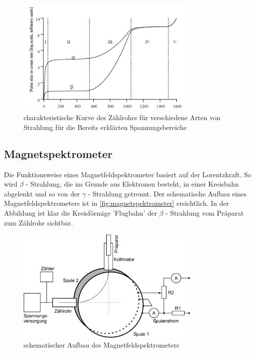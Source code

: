 \documentclass[12pt,english,ngerman]{scrartcl}
\begin{document}
\begin{figure}[H]
  \begin{center}
  \includegraphics[width=0.8\textwidth]{./figures/zcharakteristik.png}
	\end{center}
	\caption{charakteristische Kurve des Zählrohrs für verschiedene Arten von Strahlung für die 
  Bereits erklärten Spannungsbereiche \cite[]{}}
	\label{fig:zchar}
    
\end{figure}



\subsection{Magnetspektrometer}

Die Funktionsweise eines Magnetfeldspektrometer basiert auf der Lorentzkraft. So wird $\beta$ - Strahlung, die im Grunde aus 
Elektronen besteht, in einer Kreisbahn abgelenkt und so von der $\gamma$ - Strahlung getrennt. Der schematische Aufbau eines
Magnetfeldspektrometers ist in \autoref{fig:magnetspektrometer} ersichtlich. In der Abbildung ist klar die Kreisförmige
'Flugbahn' der $\beta$ - Strahlung vom Präparat zum Zählrohr sichtbar.\cite[]{}


\begin{figure}[H]
  \begin{center}
  \includegraphics[width=0.8\textwidth]{./figures/fig5.png}
	\end{center}
	\caption{schematischer Aufbau des Magnetfeldspektrometers \cite[]{}}
	\label{fig:magnetspektrometer}
    
\end{figure}
\end{document}
